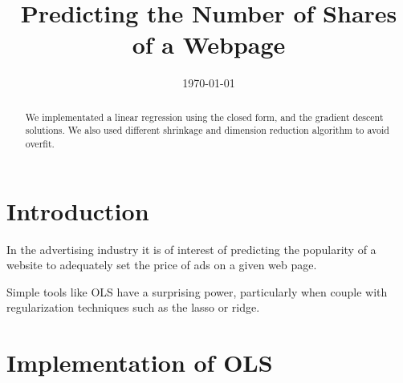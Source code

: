 \documentclass[conference]{IEEEtran}\usepackage[]{graphicx}\usepackage[]{color}
\date{\today}
\begin{document}
% 
\title{Predicting the Number of Shares of a Webpage}


\author{
  \and
  \and
  }



\maketitle



\begin{abstract}
  We implementated a linear regression using the closed form, and the
  gradient descent solutions. We also used different shrinkage and dimension
  reduction algorithm to avoid overfit.
\end{abstract}





\IEEEpeerreviewmaketitle


\section{Introduction}

In the advertising industry it is of interest of predicting the popularity of a
website to adequately set the price of ads on a given web page.


Simple tools like OLS have a surprising power, particularly when couple with
regularization techniques such as the lasso or ridge.

\section{Implementation of OLS}
\end{document}
